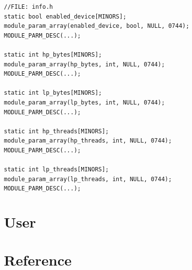 \documentclass[12pt]{report}
\begin{document}
\begin{lstlisting}
//FILE: info.h
static bool enabled_device[MINORS];
module_param_array(enabled_device, bool, NULL, 0744);
MODULE_PARM_DESC(...);

static int hp_bytes[MINORS];
module_param_array(hp_bytes, int, NULL, 0744);
MODULE_PARM_DESC(...);

static int lp_bytes[MINORS];
module_param_array(lp_bytes, int, NULL, 0744);
MODULE_PARM_DESC(...);

static int hp_threads[MINORS];
module_param_array(hp_threads, int, NULL, 0744);
MODULE_PARM_DESC(...);

static int lp_threads[MINORS];
module_param_array(lp_threads, int, NULL, 0744);
MODULE_PARM_DESC(...);
\end{lstlisting}

\chapter{User}
\chapter{Reference}
\end{document}
